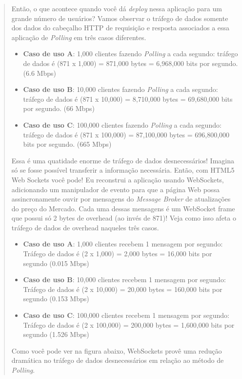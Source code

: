 \documentclass[a4paper,12pt]{article}
\begin{document}
\begin{quotation}
Então, o que acontece quando você dá \emph{deploy} nessa aplicação para um grande número de usuários? Vamos observar o tráfego de dados somente dos dados do cabeçalho HTTP de requisição e resposta associados a essa aplicação de \emph{Polling} em três casos diferentes.

\begin{itemize}
    \item \textbf{Caso de uso A}: 1,000 clientes fazendo \emph{Polling} a cada segundo: tráfego de dados é (871 x 1,000) = 871,000 bytes = 6,968,000 bits por segundo. (6.6 Mbps)
    \item \textbf{Caso de uso B}: 10,000 clientes fazendo \emph{Polling} a cada segundo: tráfego de dados é (871 x 10,000) = 8,710,000 bytes = 69,680,000 bits por segundo. (66 Mbps)
    \item \textbf{Caso de uso C}: 100,000 clientes fazendo \emph{Polling} a cada segundo: tráfego de dados é (871 x 100,000) = 87,100,000 bytes = 696,800,000 bits por segundo. (665 Mbps)
\end{itemize}

Essa é uma quatidade enorme de tráfego de dados desnecessários! Imagina só se fosse possível transferir a informação necessária. Então, com HTML5 Web Sockets você pode! Eu reconstrui a aplicação usando WebSockets, adicionando um manipulador de evento para que a página Web possa assincronamente ouvir por mensagens do \emph{Message Broker} de atualizações do preço do Mercado. Cada uma dessas mensagens é um WebSocket frame que possui só 2 bytes de overhead (ao invés de 871)! Veja como isso afeta o tráfego de dados de overhead naqueles três casos.

\begin{itemize}
    \item \textbf{Caso de uso A}: 1,000 clientes recebem 1 mensagem por segundo: Tráfego de dados é (2 x 1,000) = 2,000 bytes = 16,000 bits por segundo (0.015 Mbps)
    \item \textbf{Caso de uso B}: 10,000 clientes recebem 1 mensagem por segundo: Tráfego de dados é (2 x 10,000) = 20,000 bytes = 160,000 bits por segundo (0.153 Mbps)
    \item \textbf{Caso de uso C}: 100,000 clientes recebem 1 mensagem por segundo: Tráfego de dados é (2 x 100,000) = 200,000 bytes = 1,600,000 bits por segundo (1.526 Mbps)
\end{itemize}

Como você pode ver na figura abaixo, WebSockets provê uma redução dramática no tráfego de dados desnecessários em relação ao método de \emph{Polling}.


\end{quotation}
\end{document}
